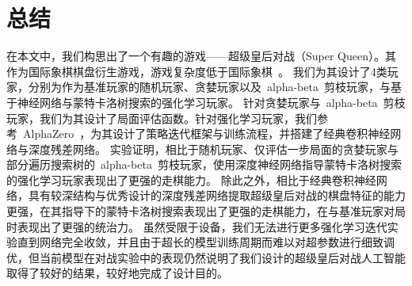 \chapter{总结}
\label{chap:conclusion}
在本文中，我们构思出了一个有趣的游戏——超级皇后对战（Super Queen）。其作为国际象棋棋盘衍生游戏，游戏复杂度低于国际象棋~\cite{enwiki:complexity}。
我们为其设计了4类玩家，分别为作为基准玩家的随机玩家、贪婪玩家以及~alpha-beta~剪枝玩家，与基于神经网络与蒙特卡洛树搜索的强化学习玩家。
针对贪婪玩家与~alpha-beta~剪枝玩家，我们为其设计了局面评估函数。针对强化学习玩家，我们参考~AlphaZero~\cite{Silver1140,Silver2017,Silver2016}，为其设计了策略迭代框架与训练流程，并搭建了经典卷积神经网络与深度残差网络\cite{resnet}。
实验证明，相比于随机玩家、仅评估一步局面的贪婪玩家与部分遍历搜索树的~alpha-beta~剪枝玩家，使用深度神经网络指导蒙特卡洛树搜索的强化学习玩家表现出了更强的走棋能力。
除此之外，相比于经典卷积神经网络，具有较深结构与优秀设计的深度残差网络提取超级皇后对战的棋盘特征的能力更强，在其指导下的蒙特卡洛树搜索表现出了更强的走棋能力，在与基准玩家对局时表现出了更强的统治力。
虽然受限于设备，我们无法进行更多强化学习迭代实验直到网络完全收敛，并且由于超长的模型训练周期而难以对超参数进行细致调优，但当前模型在对战实验中的表现仍然说明了我们设计的超级皇后对战人工智能取得了较好的结果，较好地完成了设计目的。